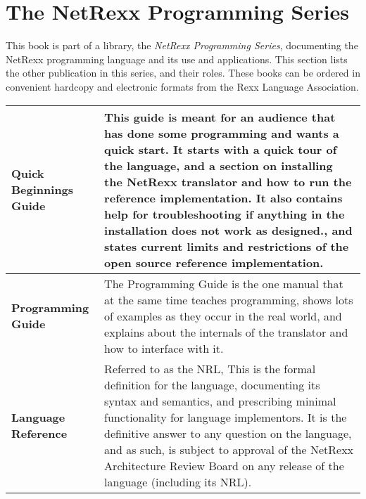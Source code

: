 \chapter{The NetRexx Programming Series}
This book is part of a library, the \emph{NetRexx Programming Series}, documenting the NetRexx programming language and its use and applications. This section lists the other publication in this series, and their roles. These books can be ordered in convenient hardcopy and electronic formats from the Rexx Language Association.
\newline
\newline
\newline
\newline
\begin{tabularx}{\textwidth}{>{\bfseries}lX}
\toprule
Quick Beginnings Guide & This guide is meant for an audience that has done some programming and wants a quick start. It starts with a quick tour of the language, and a section on installing the NetRexx translator and how to run the reference implementation. It also contains help for troubleshooting if anything in the installation does not work as designed., and states current limits and restrictions of the open source reference implementation.
\\\midrule
Programming Guide & The Programming Guide is the one manual that at the same time teaches programming, shows lots of examples as they occur in the real world, and explains about the internals of the translator and how to interface with it.
\\\midrule
Language Reference & Referred to as the NRL, This is the formal definition for the language, documenting its syntax and semantics, and prescribing minimal functionality for language implementors. It is the definitive answer to any question on the language, and as such, is subject to approval of the NetRexx Architecture Review Board on any release of the language (including its NRL).
\\\bottomrule
\end{tabularx}
